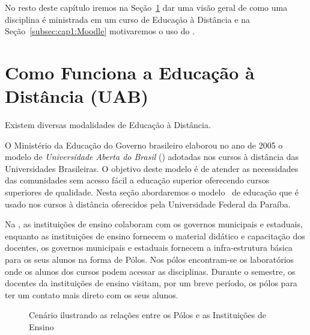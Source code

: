 No resto deste cap{\' i}tulo iremos na Se{\c c}{\~ a}o~\ref{subsec:cap1:Ead} dar uma vis{\~ a}o geral de como uma disciplina
{\' e} ministrada em um curso de Educa{\c c}{\~ a}o {\` a} Dist{\^ a}ncia e na Se{\c c}{\~ a}o~\ref{subsec:cap1:Moodle} motivaremos o
uso do \moodle.

\section{Como Funciona a Educa{\c c}{\~ a}o {\` a} Dist{\^ a}ncia (UAB)}
\label{subsec:cap1:Ead}

Existem diversas modalidades de Educa{\c c}{\~ a}o {\` a} Dist{\^ a}ncia.  

O Minist{\' e}rio da Educa{\c c}{\~ a}o do Governo brasileiro elaborou no ano de 2005 o modelo de 
\emph{Universidade Aberta do Brasil} (\uab) adotadas nos cursos {\` a} dist{\^ a}ncia das 
Universidades Brasileiras. O objetivo deste modelo {\' e} de atender as necessidades 
das comunidades sem acesso f{\' a}cil a educa{\c c}{\~ a}o superior oferecendo cursos superiores de qualidade.
Nesta se{\c c}{\~ a}o abordaremos o modelo \uab\ de educa{\c c}{\~ a}o que {\' e} usado nos cursos {\` a} dist{\^ a}ncia oferecidos pela
Universidade Federal da Para{\' i}ba.

Na \uab, as institui{\c c}{\~ o}es de ensino colaboram com os governos municipais e 
estaduais, enquanto as institui{\c c}{\~ o}es de ensino fornecem o material did{\' a}tico e capacita{\c c}{\~ a}o 
dos docentes, os governos municipais e estaduais fornecem a infra-estrutura b{\' a}sica 
para os seus alunos na forma de P{\' o}los. Nos p{\' o}los encontram-se os laborat{\' o}rios onde
os alunos dos cursos podem acessar as disciplinas. Durante o semestre, os docentes
da institui{\c c}{\~ o}es de ensino visitam, por um breve per{\' i}odo, os p{\' o}los para ter um contato mais direto com os 
seus alunos. 
\begin{figure}[htbp]
 \begin{center}
  \caption{Cen{\' a}rio ilustrando as rela{\c c}{\~ o}es entre os P{\' o}los e as Institui{\c c}{\~ o}es de Ensino}
  \label{fig:UAB}
 \end{center}
\end{figure}

